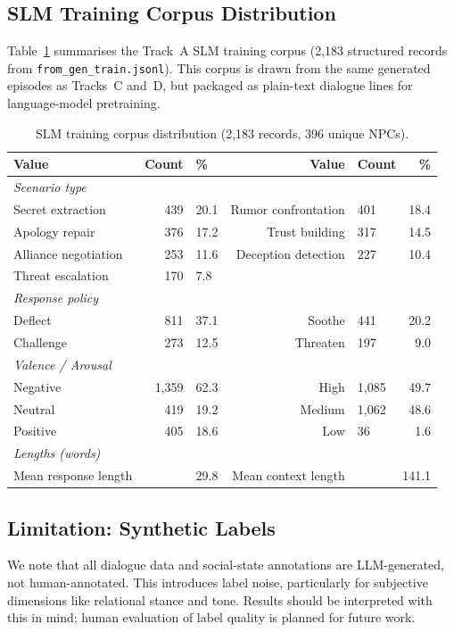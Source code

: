 \documentclass[11pt]{article}
\begin{document}
\subsection{SLM Training Corpus Distribution}

Table~\ref{tab:slm_dist} summarises the Track~A SLM training corpus (2,183 structured records from \texttt{from\_gen\_train.jsonl}).
This corpus is drawn from the same generated episodes as Tracks~C and~D, but packaged as plain-text dialogue lines for language-model pretraining.

\begin{table}[tp]
\centering
\caption{SLM training corpus distribution (2,183 records, 396 unique NPCs).}
\label{tab:slm_dist}
\footnotesize\setlength{\tabcolsep}{2.5pt}
\begin{tabular}{@{}lrlrlr@{}}
\toprule
\textbf{Value} & \textbf{Count} & \textbf{\%} & \textbf{Value} & \textbf{Count} & \textbf{\%} \\
\midrule
\multicolumn{6}{l}{\textit{Scenario type}} \\
Secret extraction    & 439 & 20.1 & Rumor confrontation & 401 & 18.4 \\
Apology repair       & 376 & 17.2 & Trust building      & 317 & 14.5 \\
Alliance negotiation & 253 & 11.6 & Deception detection & 227 & 10.4 \\
Threat escalation    & 170 &  7.8 & & & \\
\midrule
\multicolumn{6}{l}{\textit{Response policy}} \\
Deflect   & 811 & 37.1 & Soothe     & 441 & 20.2 \\
Challenge & 273 & 12.5 & Threaten & 197 &  9.0 \\
\midrule
\multicolumn{6}{l}{\textit{Valence / Arousal}} \\
Negative  & 1,359 & 62.3 & High     & 1,085 & 49.7 \\
Neutral   &   419 & 19.2 & Medium   & 1,062 & 48.6 \\
Positive  &   405 & 18.6 & Low      &    36 &  1.6 \\
\midrule
\multicolumn{6}{l}{\textit{Lengths (words)}} \\
Mean response length & \multicolumn{2}{r}{29.8} & Mean context length & \multicolumn{2}{r}{141.1} \\
\bottomrule
\end{tabular}
\end{table}

\subsection{Limitation: Synthetic Labels}
We note that all dialogue data and social-state annotations are LLM-generated, not human-annotated.
This introduces label noise, particularly for subjective dimensions like relational stance and tone.
Results should be interpreted with this in mind; human evaluation of label quality is planned for future work.
\end{document}
